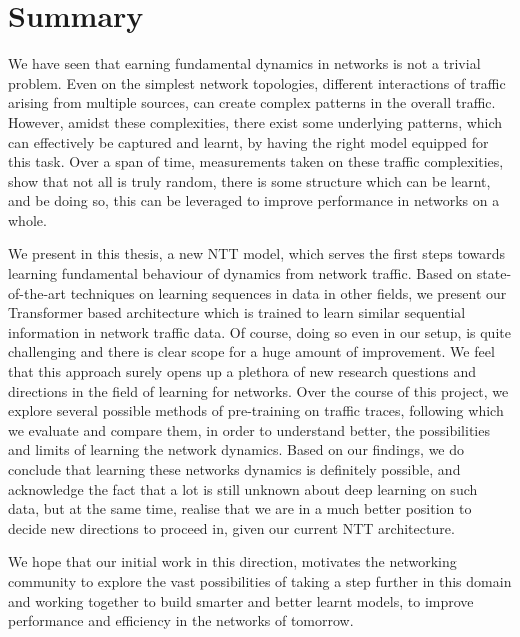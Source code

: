 \chapter{Summary}
\label{cha:summary}

We have seen that earning fundamental dynamics in networks is not a trivial problem. Even on the simplest network topologies, different interactions of traffic arising from multiple sources, can create complex patterns in the overall traffic. However, amidst these complexities, there exist some underlying patterns, which can effectively be captured and learnt, by having the right model equipped for this task. Over a span of time, measurements taken on these traffic complexities, show that not all is truly random, there is some structure which can be learnt, and be doing so, this can be leveraged to improve performance in networks on a whole.
 
We present in this thesis, a new NTT model, which serves the first steps towards learning fundamental behaviour of dynamics from network traffic. Based on state-of-the-art techniques on learning sequences in data in other fields, we present our Transformer based architecture which is trained to learn similar sequential information in network traffic data. Of course, doing so even in our setup, is quite challenging and there is clear scope for a huge amount of improvement. We feel that this approach surely opens up a plethora of new research questions and directions in the field of learning for networks. Over the course of this project, we explore several possible methods of pre-training on traffic traces, following which we evaluate and compare them, in order to understand better, the possibilities and limits of learning the network dynamics. Based on our findings, we do conclude that learning these networks dynamics is definitely possible, and acknowledge the fact that a lot is still unknown about deep learning on such data, but at the same time, realise that we are in a much better position to decide new directions to proceed in, given our current NTT architecture.
 
 We hope that our initial work in this direction, motivates the networking community to explore the vast possibilities of taking a step further in this domain and working together to build smarter and better learnt models, to improve performance and efficiency in the networks of tomorrow.